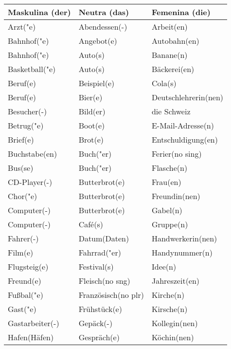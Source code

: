 \documentclass{article}
\renewcommand{\arraystretch}{1}
\begin{document}
\begin{table}[h!]
    \centering
    \renewcommand{\arraystretch}{1.5}
    \begin{tabular}{|>{\raggedright\arraybackslash}p{5cm}|>{\raggedright\arraybackslash}p{5cm}|>{\raggedright\arraybackslash}p{5cm}|}
        \hline
        \rowcolor{gray!20} \textbf{Maskulina (der)} & \textbf{Neutra (das)} & \textbf{Femenina (die)} \\
        \hline
        Arzt("e) & Abendessen(-) & Arbeit(en) \\\hline
        Bahnhof("e) & Angebot(e) & Autobahn(en) \\\hline
        Bahnhof("e) & Auto(s) & Banane(n) \\\hline
        Basketball("e) & Auto(s) & Bäckerei(en) \\\hline
        Beruf(e) & Beispiel(e) & Cola(s) \\\hline
        Beruf(e) & Bier(e) & Deutschlehrerin(nen) \\\hline
        Besucher(-) & Bild(er) & die Schweiz \\\hline
        Betrug("e) & Boot(e) & E-Mail-Adresse(n) \\\hline
        Brief(e) & Brot(e) & Entschuldigung(en) \\\hline
        Buchstabe(en) & Buch("er) & Ferier(no sing) \\\hline
        Bus(se) & Buch("er) & Flasche(n) \\\hline
        CD-Player(-) & Butterbrot(e) & Frau(en) \\\hline
        Chor("e) & Butterbrot(e) & Freundin(nen) \\\hline
        Computer(-) & Butterbrot(e) & Gabel(n) \\\hline
        Computer(-) & Café(s) & Gruppe(n) \\\hline
        Fahrer(-) & Datum(Daten) & Handwerkerin(nen) \\\hline
        Film(e) & Fahrrad("er) & Handynummer(n) \\\hline
        Flugsteig(e) & Festival(s) & Idee(n) \\\hline
        Freund(e) & Fleisch(no sng) & Jahreszeit(en) \\\hline
        Fu\ss{}bal("e) & Französisch(no plr) & Kirche(n) \\\hline
        Gast("e) & Frühstück(e) & Kirsche(n) \\\hline
        Gastarbeiter(-) & Gepäck(-) & Kollegin(nen) \\\hline
        Hafen(Häfen) & Gespräch(e) & Köchin(nen) \\\hline

\end{tabular}
\end{table}
\end{document}
